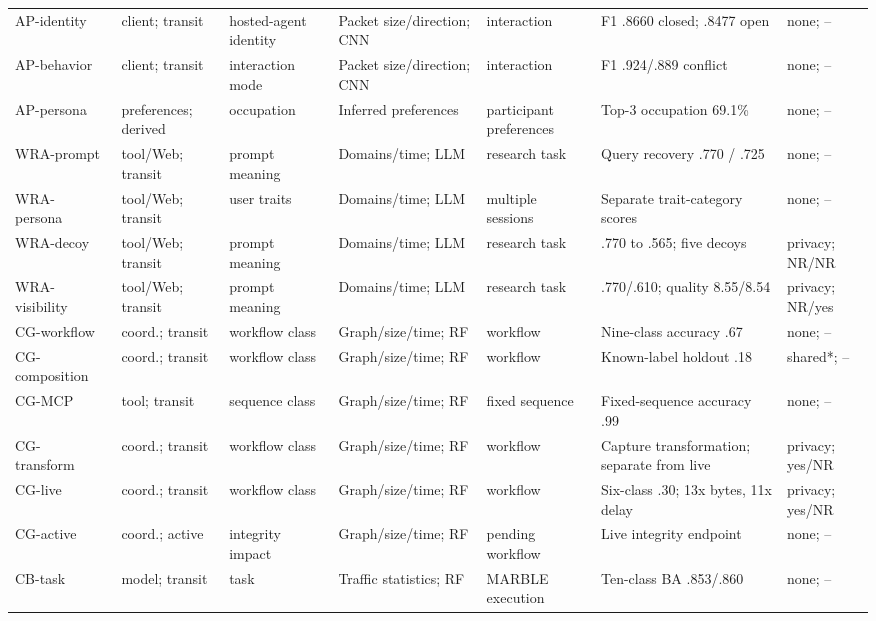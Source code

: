 \begin{table}[t]
\begin{tabularx}{\textwidth}{@{}P{.14\textwidth}P{.11\textwidth}P{.13\textwidth}P{.14\textwidth}P{.12\textwidth}Y P{.09\textwidth}@{}}
AP-identity~\cite{agentprint2025} & client; transit & hosted-agent identity & Packet size/direction; CNN & interaction & F1 .8660 closed; .8477 open & none; -- \\
AP-behavior~\cite{agentprint2025} & client; transit & interaction mode & Packet size/direction; CNN & interaction & F1 .924/.889 conflict & none; -- \\
AP-persona~\cite{agentprint2025} & preferences; derived & occupation & Inferred preferences & participant preferences & Top-3 occupation 69.1\% & none; -- \\
WRA-prompt~\cite{jeong2026wra} & tool/Web; transit & prompt meaning & Domains/time; LLM & research task & Query recovery .770 / .725 & none; -- \\
WRA-persona~\cite{jeong2026wra} & tool/Web; transit & user traits & Domains/time; LLM & multiple sessions & Separate trait-category scores & none; -- \\
WRA-decoy~\cite{jeong2026wra} & tool/Web; transit & prompt meaning & Domains/time; LLM & research task & .770 to .565; five decoys & privacy; NR/NR \\
WRA-visibility~\cite{jeong2026wra} & tool/Web; transit & prompt meaning & Domains/time; LLM & research task & .770/.610; quality 8.55/8.54 & privacy; NR/yes \\
CG-workflow~\cite{dangol2026workflow} & coord.; transit & workflow class & Graph/size/time; RF & workflow & Nine-class accuracy .67 & none; -- \\
CG-composition~\cite{dangol2026workflow} & coord.; transit & workflow class & Graph/size/time; RF & workflow & Known-label holdout .18 & shared*; -- \\
CG-MCP~\cite{dangol2026workflow} & tool; transit & sequence class & Graph/size/time; RF & fixed sequence & Fixed-sequence accuracy .99 & none; -- \\
CG-transform~\cite{dangol2026workflow} & coord.; transit & workflow class & Graph/size/time; RF & workflow & Capture transformation; separate from live & privacy; yes/NR \\
CG-live~\cite{dangol2026workflow} & coord.; transit & workflow class & Graph/size/time; RF & workflow & Six-class .30; 13x bytes, 11x delay & privacy; yes/NR \\
CG-active~\cite{dangol2026workflow} & coord.; active & integrity impact & Graph/size/time; RF & pending workflow & Live integrity endpoint & none; -- \\
CB-task~\cite{pouryousef2026traffic} & model; transit & task & Traffic statistics; RF & MARBLE execution & Ten-class BA .853/.860 & none; -- \\

\end{tabularx}
\end{table}
